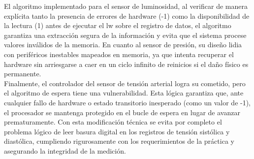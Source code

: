\documentclass[]{article}
\begin{document}
	El algoritmo implementado para el sensor de luminosidad, al verificar de manera explícita tanto la presencia de errores de hardware (-1) como la disponibilidad de la lectura (1) antes de ejecutar el lw sobre el registro de datos, el algoritmo garantiza una extracción segura de la información y evita que el sistema procese valores inválidos de la memoria. En cuanto al sensor de presión, su diseño lidia con periféricos inestables mapeados en memoria, ya que intenta recuperar el hardware sin arriesgarse a caer en un ciclo infinito de reinicios si el daño físico es permanente. \\
	
	Finalmente, el controlador del sensor de tensión arterial logra su cometido, pero el algoritmo de espera tiene una vulnerabilidad. Esta lógica garantiza que, ante cualquier fallo de hardware o estado transitorio inesperado (como un valor de -1), el procesador se mantenga protegido en el bucle de espera en lugar de avanzar prematuramente. Con esta modificación técnica se evita por completo el problema lógico de leer basura digital en los registros de tensión sistólica y diastólica, cumpliendo rigurosamente con los requerimientos de la práctica y asegurando la integridad de la medición. \\
	
\end{document}
